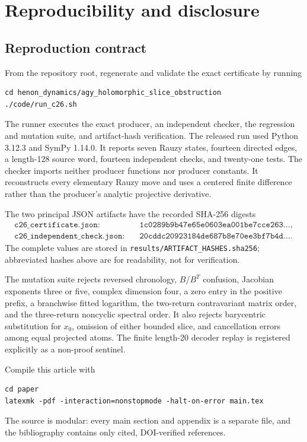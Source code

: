 \section{Reproducibility and disclosure}
\label{app:reproducibility}

\subsection{Reproduction contract}

From the repository root, regenerate and validate the exact certificate by
running
\begin{verbatim}
cd henon_dynamics/agy_holomorphic_slice_obstruction
./code/run_c26.sh
\end{verbatim}
The runner executes the exact producer, an independent checker, the
regression and mutation suite, and artifact-hash verification.  The released
run used Python 3.12.3 and SymPy 1.14.0.  It reports seven Rauzy states,
fourteen directed edges, a length-128 source word, fourteen independent
checks, and twenty-one tests.  The checker imports neither producer functions nor
producer constants.  It reconstructs every elementary Rauzy move and uses a
centered finite difference rather than the producer's analytic projective
derivative.

The two principal JSON artifacts have the recorded SHA-256 digests
\begin{align*}
 \texttt{c26\_certificate.json}:\quad&
 \texttt{1c0289b9b47e65e0603ea001be7cce263}\ldots,\\
 \texttt{c26\_independent\_check.json}:\quad&
 \texttt{20cddc20923184de687b8e70ee3bf7b4d}\ldots.
\end{align*}
The complete values are stored in
\texttt{results/ARTIFACT\_HASHES.sha256}; abbreviated hashes above are for
readability, not for verification.

The mutation suite rejects reversed chronology, \(B\)/\(B^T\) confusion,
Jacobian exponents three or five, complex dimension four, a zero entry in
the positive prefix, a branchwise fitted logarithm, the two-return
contravariant matrix order, and the three-return noncyclic spectral order.
It also rejects barycentric substitution for \(x_0\), omission of either
bounded slice, and cancellation errors among equal projected atoms.  The
finite length-20 decoder replay is registered explicitly as a non-proof
sentinel.

Compile this article with
\begin{verbatim}
cd paper
latexmk -pdf -interaction=nonstopmode -halt-on-error main.tex
\end{verbatim}
The source is modular: every main section and appendix is a separate file,
and the bibliography contains only cited, DOI-verified references.

